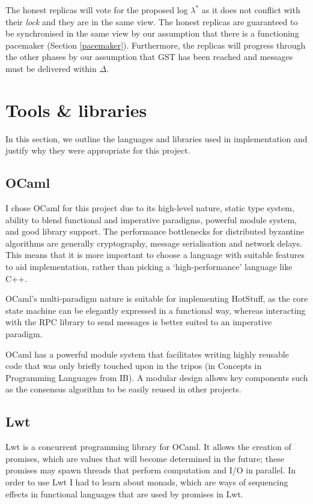 The honest replicas will vote for the proposed log $\lambda^*$ as it does not conflict with their \textit{lock} and they are in the same view. The honest replicas are guaranteed to be synchronised in the same view by our assumption that there is a functioning pacemaker (Section \ref{pacemaker}). Furthermore, the replicas will progress through the other phases by our assumption that GST has been reached and messages must be delivered within $\Delta$.

\section{Tools \& libraries} \label{tools}
In this section, we outline the languages and libraries used in implementation and justify why they were appropriate for this project.

\subsection{OCaml}
I chose OCaml \cite{ocaml} for this project due to its high-level nature, static type system, ability to blend functional and imperative paradigms, powerful module system, and good library support. The performance bottlenecks for distributed byzantine algorithms are generally cryptography, message serialisation and network delays. This means that it is more important to choose a language with suitable features to aid implementation, rather than picking a `high-performance' language like C++.

OCaml's multi-paradigm nature is suitable for implementing HotStuff, as the core state machine can be elegantly expressed in a functional way, whereas interacting with the RPC library to send messages is better suited to an imperative paradigm.

OCaml has a powerful module system that facilitates writing highly reusable code that was only briefly touched upon in the tripos (in Concepts in Programming Languages from IB). A modular design allows key components such as the consensus algorithm to be easily reused in other projects.

\subsection{Lwt}
Lwt \cite{lwt} is a concurrent programming library for OCaml. It allows the creation of promises, which are values that will become determined in the future; these promises may spawn threads that perform computation and I/O in parallel. In order to use Lwt I had to learn about monads, which are ways of sequencing effects in functional languages that are used by promises in Lwt.

